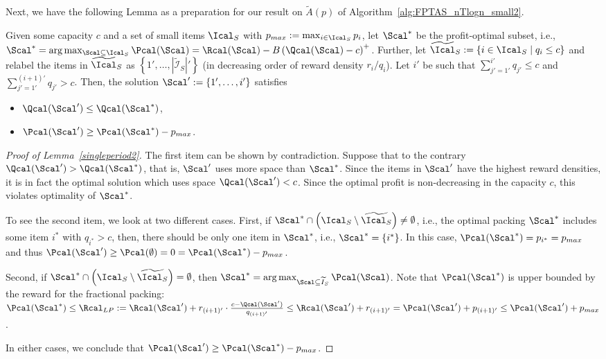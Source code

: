 Next, we have the following Lemma as a preparation for our result on $\widetilde{A}(p)$ of Algorithm~\ref{alg:FPTAS_nTlogn_small2}.
\begin{lemma}\label{singleperiod2}
Given some capacity $c$ and a set of small items $\Ical_S$ with $p_{max}:=\max_{i\in \Ical_S}p_i$, let $\Scal^*$ be the profit-optimal subset, i.e., $\Scal^*=\arg\max_{
	\Scal\subseteq \Ical_S}\Pcal(\Scal)=\Rcal(\Scal)-B\left(\Qcal(\Scal)-c\right)^+$. Further, let $\widetilde{\Ical}_S := \{i\in \Ical_S\mid q_i\le c\}$ and relabel the items in $\widetilde{\Ical}_S$ as $\left\{1',\ldots,|\widetilde{\mathcal{I}}_S|'\right\}$ (in decreasing order of reward density $r_i/q_i$). Let $i'$ be such that $\sum_{j'=1'}^{i'}q_{j'}\le c$ and $\sum_{j'=1'}^{(i+1)'}q_{j'}> c$. Then, the solution $\Scal':=\{1',\ldots,i'\}$ satisfies
\begin{itemize}
	\item $\Qcal(\Scal') \le \Qcal(\Scal^*)$,
	\item $\Pcal(\Scal')\ge \Pcal(\Scal^*) - p_{max}$.
\end{itemize}
\end{lemma}
\begin{proof}[Proof of Lemma~\ref{singleperiod2}]
	The first item can be shown by contradiction. Suppose that to the contrary $\Qcal(\Scal') > \Qcal(\Scal^*)$, that is, $\Scal'$ uses more space than $\Scal^*$. Since the items in $\Scal'$ have the highest reward densities, it is in fact the optimal solution which uses space $\Qcal(\Scal')<c$. Since the optimal profit is non-decreasing in the capacity $c$, this violates optimality of $\Scal^*$.
	
	To see the second item, we look at two different cases. First, if $\Scal^*\cap \left(\Ical_S\setminus \widetilde{\Ical_S}\right)\ne \emptyset$, i.e., the optimal packing $\Scal^*$ includes some item $i^*$ with $q_{i^*}>c$, then, there should be only one item in $\Scal^*$, i.e., $\Scal^* = \{i^*\}$. In this case, $\Pcal(\Scal^*) = p_{i^*} = p_{max}$ and thus $\Pcal(\Scal')\ge \Pcal(\emptyset) = 0 = \Pcal(\Scal^*)-p_{max}$.
	
	Second, if $\Scal^*\cap \left(\Ical_S\setminus \widetilde{\Ical_S}\right)= \emptyset$, then $\Scal^* = \arg\max_{\Scal\subseteq \widetilde{I}_S}\Pcal(\Scal)$. Note that $\Pcal(\Scal^*)$ is upper bounded by the reward for the fractional packing: $ \Pcal(\Scal^*) \leq \Rcal_{LP} := \Rcal(\Scal') + r_{(i+1)'}\cdot \frac{ c - \Qcal(\Scal')}{q_{(i+1)'}} \leq \Rcal(\Scal') + r_{(i+1)'} = \Pcal(\Scal') + p_{(i+1)'}\le \Pcal(\Scal') + p_{max}$.
	
	In either cases, we conclude that $\Pcal(\Scal')\ge \Pcal(\Scal^*) - p_{max}$.
\end{proof}

